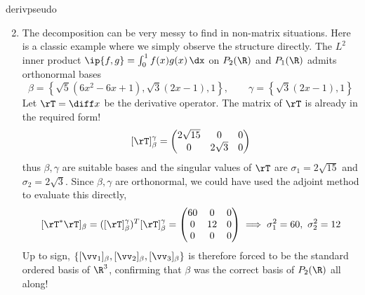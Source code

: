 \begin{examples}{}{derivpseudo}
\begin{enumerate}\setcounter{enumi}{1}
  \item\label{ex:derivpseudo2} The decomposition can be very messy to find in non-matrix situations. Here is a classic example where we simply observe the structure directly.\smallbreak
  The $L^2$ inner product $\ip{f,g}=\int_0^1f(x)g(x)\,\dx$ on $P_2(\R)$ and $P_1(\R)$ admits orthonormal bases
\[\beta=\left\{\sqrt 5(6x^2-6x+1),\sqrt 3(2x-1),1\right\},\qquad \gamma=\left\{\sqrt 3(2x-1),1\right\}\]
Let $\rT=\diff x$ be the derivative operator. The matrix of $\rT$ is already in the required form!
\[[\rT]_\beta^\gamma=\begin{pmatrix}
2\sqrt{15}&0&0\\
0&2\sqrt 3&0
\end{pmatrix}\]
thus $\beta,\gamma$ are suitable bases and the singular values of $\rT$ are $\sigma_1=2\sqrt{15}$ and $\sigma_2=2\sqrt 3$.\smallbreak
Since $\beta,\gamma$ are orthonormal, we could have used the adjoint method to evaluate this directly,
\[[\rT^*\rT]_\beta=([\rT]_\beta^\gamma)^T[\rT]_\beta^\gamma=\begin{pmatrix}
60&0&0\\
0&12&0\\
0&0&0
\end{pmatrix}\implies \sigma_1^2=60,\ \sigma_2^2=12\]
Up to sign, $\{[\vv_1]_\beta,[\vv_2]_\beta,[\vv_3]_\beta\}$ is therefore forced to be the standard ordered basis of $\R^3$, confirming that $\beta$ was the correct basis of $P_2(\R)$ all along! %
\end{enumerate}
\end{examples}







